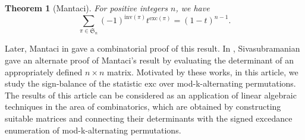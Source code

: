 \documentclass[12pt]{article}
\newcommand{\SSS}{\mathfrak{S}}
\newcommand{\AAA}{\mathcal{A}}
\newcommand{\PAP}{\mathrm{PAP}}
\newcommand{\NPAP}{\mathrm{NPAP}}
\newcommand{\inv}{\mathrm{inv}}
\newcommand{\des}{\mathrm{des}}
\newcommand{\exc}{\mathrm{exc}}
\newtheorem{theorem}{\bf Theorem}[section]
\begin{document}



\begin{theorem}[Mantaci]
	\label{thm:Mant_signed_exc}
	For positive integers $n$, we have 
	 \begin{equation*}
	 \sum_{\pi \in \SSS_n}(-1)^{\inv(\pi)} t ^{\exc(\pi)} =
	 (1-t)^{n-1} . 
	\end{equation*}
	\end{theorem}

Later, Mantaci in \cite{Mantaci-binomial} gave a combinatorial proof of this result. In \cite{Sivasubramanian-adv-exc}, Sivasubramanian gave an alternate proof of Mantaci’s result by evaluating the determinant of an appropriately defined $n \times n$ matrix. Motivated by these works, in this article, we study the sign-balance of the statistic $\exc$ over mod-k-alternating permutations. The results of this article can be considered as an application of linear algebraic techniques in the area of combinatorics, which are obtained by constructing suitable matrices and connecting their determinants with the signed excedance enumeration of mod-k-alternating permutations.



\end{document}
